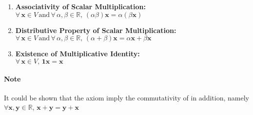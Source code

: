 \documentclass[11pt]{article}
\begin{document}
\begin{definition}
\begin{enumerate}
\begin{enumerate}
            \item \textbf{Associativity of Scalar Multiplication:} \\
            $\forall \, \textbf{x} \in V \, \text{and} \, \forall \, \alpha, \beta \in \mathbb{R}, \, (\alpha \beta) \textbf{x} = \alpha (\beta \textbf{x})$
            
            \item \textbf{Distributive Property of Scalar Multiplication:} \\
            $\forall \, \textbf{x} \in V \, \text{and} \, \forall \, \alpha, \beta \in \mathbb{R}, \, (\alpha + \beta) \textbf{x} = \alpha \textbf{x} + \beta \textbf{x}$
            
            \item \textbf{Existence of Multiplicative Identity:} \\
            $\forall \, \textbf{x} \in V, \, \textbf{1} \textbf{x} = \textbf{x}$
        \end{enumerate}
    \end{enumerate}
     
    \paragraph{Note} It could be shown that the axiom imply the commutativity of in addition, namely $\forall \textbf{x}, \textbf{y} \in \mathbb{R}$, $\textbf{x} + \textbf{y} = \textbf{y} + \textbf{x}$
\end{definition}
\end{document}
